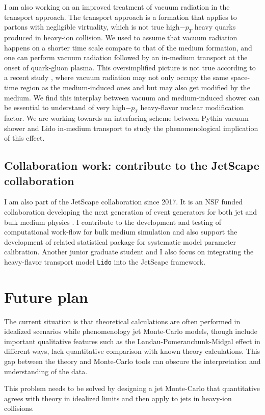 \documentclass[10pt,a4paper]{article}
\begin{document}
I am also working on an improved treatment of vacuum radiation in the transport approach. The transport approach is a formation that applies to partons with negligible virtuality, which is not true high$-p_T$ heavy quarks produced  in heavy-ion collision. 
We used to assume that vacuum radiation happens on a shorter time scale compare to that of the medium formation, and one can perform vacuum radiation followed by an in-medium transport at the onset of quark-gluon plasma.
This oversimplified picture is not true according to a recent study \cite{Caucal:2018dla}, where vacuum radiation may not only occupy the same space-time region as the medium-induced ones and but may also get modified by the medium.
We find this interplay between vacuum and medium-induced shower can be essential to understand of very high$-p_T$ heavy-flavor nuclear modification factor. 
We are working towards an interfacing scheme between Pythia vacuum shower and Lido in-medium transport to study the phenomenological implication of this effect.

\subsection{  Collaboration work: contribute to the JetScape collaboration}

I am also part of the JetScape collaboration since 2017. It is an NSF funded collaboration developing the next generation of event generators for both jet and bulk medium physics \cite{JetScape}. 
I contribute to the development and testing of computational work-flow for bulk medium simulation and also support the development of related statistical package for systematic model parameter calibration.
Another junior graduate student and I also focus on integrating the heavy-flavor transport model {\tt Lido} into the JetScape framework.

\section{Future plan}
The current situation is that theoretical calculations are often performed in idealized scenarios while phenomenology jet Monte-Carlo models, though include important qualitative features such as the Landau-Pomeranchunk-Midgal effect in different ways, lack quantitative comparison with known theory calculations.
This gap between the theory and Monte-Carlo tools can obscure the interpretation and understanding of the data.

This problem needs to be solved by designing a jet Monte-Carlo that quantitative agrees with theory in idealized limits and then apply to jets in heavy-ion collisions.
\end{document}
